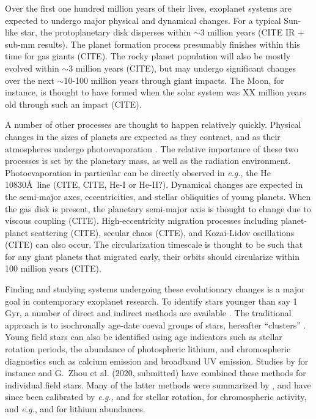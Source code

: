 \documentclass[12pt,twocolumn,tighten]{aastex63}
\begin{document}
Over the first one hundred million years of their lives, exoplanet
systems are expected to undergo major physical and dynamical changes.
For a typical Sun-like star, the protoplanetary disk disperses within
$\sim$3 million years (CITE IR + sub-mm results).  The planet
formation process presumably finishes within this time for gas giants
(CITE).  The rocky planet population will also be mostly evolved
within $\sim$3 million years (CITE), but may undergo significant
changes over the next $\sim$10-100 million years through giant
impacts.  The Moon, for instance, is thought to have formed when the
solar system was XX million years old through such an impact (CITE).

A number of other processes are thought to happen relatively quickly.
Physical changes in the sizes of planets are expected as they
contract, and as their atmospheres undergo photoevaporation
\citep[{\it
e.g.},][]{Fortney_et_al_2007,Owen_Wu_2013,Fulton_et_al_2017}.  The
relative importance of these two processes is set by the planetary
mass, as well as the radiation environment.  Photoevaporation in
particular can be directly observed in {\it e.g.}, the He 10830\AA\
line (CITE, CITE, He-I or He-II?).  Dynamical changes are expected in
the semi-major axes, eccentricities, and stellar obliquities of young
planets.  When the gas disk is present, the planetary semi-major axis
is thought to change due to viscous coupling (CITE).
High-eccentricity migration processes including planet-planet
scattering (CITE), secular chaos (CITE), and Kozai-Lidov oscillations
(CITE) can also occur.  The circularization timescale is thought to be
such that for any giant planets that migrated early, their orbits
should circularize within 100 million years (CITE).

Finding and studying systems undergoing these evolutionary changes is
a major goal in contemporary exoplanet research.  To identify stars
younger than say 1$\,$Gyr, a number of direct and indirect methods are
available \citep{soderblom_ages_2010}.  The traditional approach is to
isochronally age-date coeval groups of stars, hereafter ``clusters''
\citep[{\it
e.g.},][]{lada_embedded_2003,zuckerman_young_2004,krumholz_star_2019}.
Young field stars can also be identified using age indicators such as
stellar rotation periods, the abundance of photospheric lithium, and
chromospheric diagnostics such as calcium emission and broadband UV
emission.  Studies by for instance \citet{david_discovery_2018} and
G{.}~Zhou et al. (2020, submitted) have combined these methods for
individual field stars.  Many of the latter methods were summarized by
\citet{mamajek_improved_2008}, and have since been calibrated by {\it
e.g.},
\citet{barnes_color-period_2015,meibom_spin-down_2015,angus_calibrating_2015}
and \citet{curtis_tess_2019} for stellar rotation,
\citet{zerjal_chromospherically_2017} for chromospheric activity, and
{\it e.g.}, \citet{berger_identifying_2018} and
\citet{zerjal_galah_2019} for lithium abundances.
\end{document}
